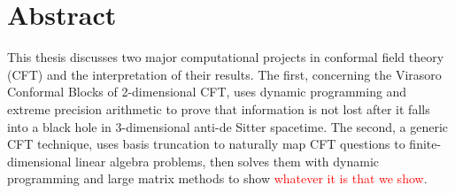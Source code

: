 \chapter*{Abstract}

This thesis discusses two major computational projects in conformal field theory
(CFT) and the interpretation of their results. The first, concerning the 
Virasoro Conformal Blocks of 2-dimensional CFT, uses dynamic programming and 
extreme precision arithmetic to prove that information is not lost after it 
falls into a black hole in 3-dimensional anti-de Sitter spacetime. The second,
a generic CFT technique, uses basis truncation to naturally map CFT questions to
finite-dimensional linear algebra problems, then solves them with dynamic
programming and large matrix methods to show \textcolor{red}{whatever it is that
we show}.

